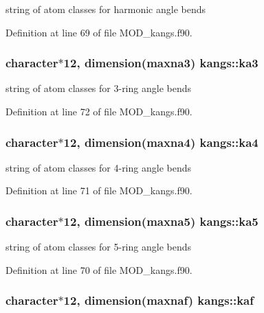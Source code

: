 string of atom classes for harmonic angle bends 



Definition at line 69 of file M\-O\-D\-\_\-kangs.\-f90.

\hypertarget{classkangs_a0a22676237c9ea47b00f2bcbd8dd55cc}{
\subsubsection[{ka3}]{\setlength{\rightskip}{0pt plus 5cm}character$\ast$12, dimension({\bf maxna3}) kangs\-::ka3}}\label{classkangs_a0a22676237c9ea47b00f2bcbd8dd55cc}


string of atom classes for 3-\/ring angle bends 



Definition at line 72 of file M\-O\-D\-\_\-kangs.\-f90.

\hypertarget{classkangs_a7bb1f15f3487d97419dced289b6236c1}{
\subsubsection[{ka4}]{\setlength{\rightskip}{0pt plus 5cm}character$\ast$12, dimension({\bf maxna4}) kangs\-::ka4}}\label{classkangs_a7bb1f15f3487d97419dced289b6236c1}


string of atom classes for 4-\/ring angle bends 



Definition at line 71 of file M\-O\-D\-\_\-kangs.\-f90.

\hypertarget{classkangs_a5dbf7fa314a6017c799bfe2f3acb1a4b}{
\subsubsection[{ka5}]{\setlength{\rightskip}{0pt plus 5cm}character$\ast$12, dimension({\bf maxna5}) kangs\-::ka5}}\label{classkangs_a5dbf7fa314a6017c799bfe2f3acb1a4b}


string of atom classes for 5-\/ring angle bends 



Definition at line 70 of file M\-O\-D\-\_\-kangs.\-f90.

\hypertarget{classkangs_a33688ec74ecb124818ee49caddc6d717}{
\subsubsection[{kaf}]{\setlength{\rightskip}{0pt plus 5cm}character$\ast$12, dimension({\bf maxnaf}) kangs\-::kaf}}\label{classkangs_a33688ec74ecb124818ee49caddc6d717}


